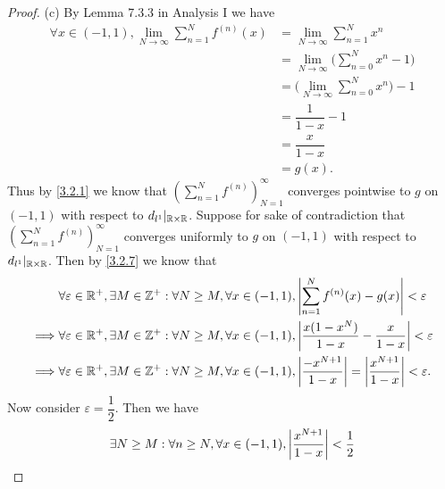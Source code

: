 \begin{proof}{(c)}
  By Lemma 7.3.3 in Analysis I we have
  \begin{align*}
    \forall x \in (-1, 1), \lim_{N \to \infty} \sum_{n = 1}^N f^{(n)}(x) & = \lim_{N \to \infty} \sum_{n = 1}^N x^n                 \\
                                                                         & = \lim_{N \to \infty} \bigg(\sum_{n = 0}^N x^n - 1\bigg) \\
                                                                         & = \bigg(\lim_{N \to \infty} \sum_{n = 0}^N x^n\bigg) - 1 \\
                                                                         & = \dfrac{1}{1 - x} - 1                                   \\
                                                                         & = \dfrac{x}{1 - x}                                       \\
                                                                         & = g(x).
  \end{align*}
  Thus by \cref{3.2.1} we know that \((\sum_{n = 1}^N f^{(n)})_{N = 1}^\infty\) converges pointwise to \(g\) on \((-1, 1)\) with respect to \(d_{l^1}|_{\mathbb{R} \times \mathbb{R}}\).
  Suppose for sake of contradiction that \((\sum_{n = 1}^N f^{(n)})_{N = 1}^\infty\) converges uniformly to \(g\) on \((-1, 1)\) with respect to \(d_{l^1}|_{\mathbb{R} \times \mathbb{R}}\).
  Then by \cref{3.2.7} we know that
  \begin{align*}
             & \forall \varepsilon \in \mathbb{R}^+, \exists M \in \mathbb{Z}^+ : \forall N \geq M, \forall x \in (-1, 1), \left\lvert\sum_{n = 1}^N f^{(n)}(x) - g(x)\right\rvert < \varepsilon                            \\
    \implies & \forall \varepsilon \in \mathbb{R}^+, \exists M \in \mathbb{Z}^+ : \forall N \geq M, \forall x \in (-1, 1), \left\lvert\dfrac{x(1 - x^N)}{1 - x} - \dfrac{x}{1 - x}\right\rvert < \varepsilon                \\
    \implies & \forall \varepsilon \in \mathbb{R}^+, \exists M \in \mathbb{Z}^+ : \forall N \geq M, \forall x \in (-1, 1), \left\lvert\dfrac{-x^{N + 1}}{1 - x}\right\rvert = \left\lvert\dfrac{x^{N + 1}}{1 - x}\right\rvert < \varepsilon.
  \end{align*}
  Now consider \(\varepsilon = \dfrac{1}{2}\).
  Then we have
  \begin{align*}
             & \exists N \geq M : \forall n \geq N, \forall x \in (-1, 1), \abs{\dfrac{x^{N + 1}}{1 - x}} < \dfrac{1}{2}                                                               \\

\end{align*}
\end{proof}
